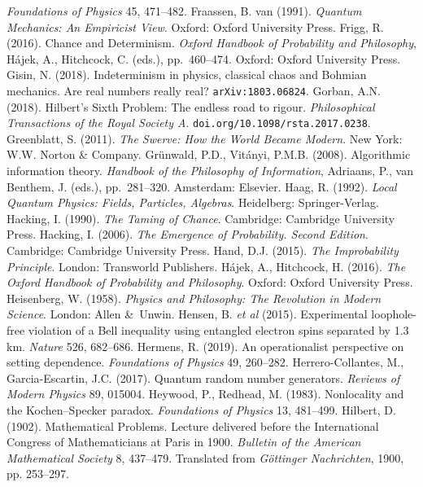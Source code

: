\documentclass[11pt,a4paper]{article}
\numberwithin{equation}{section}
\begin{document}
\begin{small}
\begin{thebibliography}{99}
\emph{Foundations of Physics} 45, 471--482.
\bibitem{}Fraassen, B. van (1991). \emph{Quantum Mechanics: An Empiricist View}. 
Oxford: Oxford University Press.
\bibitem{} Frigg, R. (2016). Chance and Determinism. \emph{Oxford Handbook of Probability and Philosophy}, H\'{a}jek, A., Hitchcock, C. (eds.), pp.\ 460--474. Oxford: Oxford University Press. 
\bibitem{} Gisin, N. (2018). Indeterminism in physics, classical chaos and Bohmian mechanics. Are real numbers really real?
\texttt{arXiv:1803.06824}.
\bibitem{} Gorban, A.N. (2018). Hilbert's Sixth Problem: The endless road to rigour. \emph{Philosophical Transactions of the Royal Society A}. \texttt{doi.org/10.1098/rsta.2017.0238}.
\bibitem{} Greenblatt, S. (2011).
\emph{The Swerve: How the World Became Modern}. New York: W.W. Norton \& Company.
\bibitem{} Gr\"{u}nwald, P.D., Vit\'{a}nyi, P.M.B. (2008). Algorithmic information theory. 
\emph{Handbook of the Philosophy of Information}, Adriaans, P., van Benthem, J. (eds.), 
 pp.\ 281--320. Amsterdam: Elsevier. 
  \bibitem{}   Haag, R. (1992).   \emph{Local Quantum Physics: Fields, Particles, Algebras}. 
Heidelberg: Springer-Verlag.  
\bibitem{}Hacking, I. (1990). \emph{The Taming of Chance}.  Cambridge: Cambridge University Press.
\bibitem{}Hacking, I. (2006). \emph{The Emergence of Probability. Second Edition}.  Cambridge: Cambridge University Press. 
  \bibitem{}  Hand, D.J. (2015).  \emph{The Improbability Principle}. London: Transworld Publishers.
    \bibitem{} H\'{a}jek, A., Hitchcock, H. (2016). \emph{The Oxford Handbook of Probability and Philosophy}. Oxford: Oxford University Press. 
  \bibitem{} Heisenberg, W. (1958). \emph{Physics and Philosophy: The Revolution in Modern Science}. London: Allen \&\ Unwin.
  \bibitem{}Hensen, B. \emph{et al}  (2015). Experimental loophole-free violation of a Bell inequality using entangled electron spins separated by 1.3 km. \emph{Nature} 526, 682--686. 
  \bibitem{} Hermens, R. (2019).   An operationalist perspective on setting dependence.
  \emph{Foundations of Physics} 49, 260--282. 
 \bibitem{}   Herrero-Collantes, M.,  Garcia-Escartin, J.C. (2017). Quantum random number generators.
 \emph{Reviews of Modern Physics} 89, 015004. 
 \bibitem{}
 Heywood, P., Redhead, M. (1983). Nonlocality and the Kochen--Specker paradox. \emph{Foundations of Physics}
 13, 481--499.
 \bibitem{}  Hilbert, D. (1902). Mathematical Problems. Lecture delivered before the International Congress of Mathematicians at Paris in 1900. \emph{Bulletin of the American Mathematical Society} 8, 437--479. Translated from  \emph{G\"{o}ttinger Nachrichten}, 1900, pp. 253--297.

\end{thebibliography}
\end{small}
\end{document}
